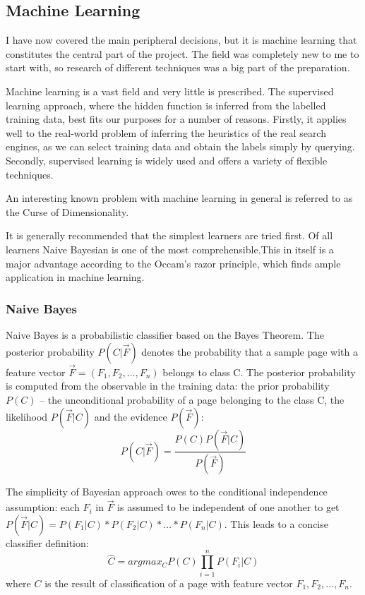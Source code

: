\documentclass[12pt,twoside,notitlepage]{report}
\begin{document}
\subsection{Machine Learning}

I have now covered the main peripheral decisions, but it is machine learning that
constitutes the central part of the project. The field was completely new to me
to start with, so research of different techniques was a big part of the
preparation.

Machine learning is a vast field and very little is prescribed.
The supervised learning approach, where the hidden function is
inferred from the labelled training data, best fits our purposes for a number
of reasons. Firstly, it applies well to the real-world problem of inferring the
heuristics of the real search engines, as we can select training data and
obtain the labels simply by querying. Secondly, supervised learning is widely
used and offers a variety of flexible techniques.

An interesting known problem with machine learning in general is referred to as
the Curse of Dimensionality.

It is generally recommended that the simplest learners are tried
first\cite{domingos}. Of all learners Naive Bayesian is one of the most
comprehensible.This in itself is a major advantage according to the Occam's
razor principle, which finds ample application in machine learning.

\subsubsection*{Naive Bayes}

Naive Bayes is a probabilistic classifier based on the Bayes Theorem. The
posterior probability \(P(C|\vec{F})\) denotes the probability that a sample
page with a feature vector \(\vec{F}=(F_1,F_2,\dots,F_n)\) belongs to class C.
The posterior probability is computed from the observable in the training data: the prior
probability \(P(C)\) -- the unconditional probability of a page belonging to
the class C, the likelihood \(P(\vec{F}|C)\) and the evidence \(P(\vec{F})\):
\begin{equation}
P(C|\vec{F}) = \frac{P(C)P(\vec{F}|C)}{P(\vec{F})}
\end{equation}

The simplicity of Bayesian approach owes to the conditional independence
assumption: each \(F_i\) in \(\vec{F}\) is assumed to be independent of one
another to get \(P(\vec{F}|C)=P(F_1|C)*P(F_2|C)*\dots*P(F_n|C)\). This leads to a concise classifier definition:
\begin{equation}
\hat{C}= argmax_C P(C)\prod_{i=1}^{n}P(F_i|C)
\end{equation}
where \(C\) is the result of classification of a page with feature vector
\(F_1,F_2,\dots,F_n\).
\end{document}
